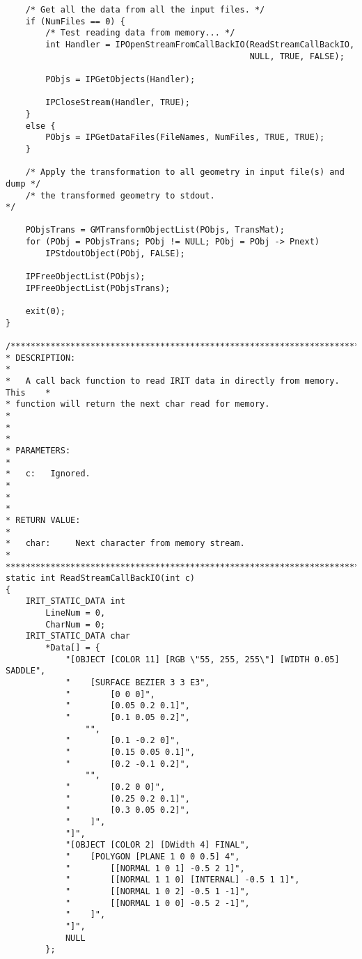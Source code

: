 \begin{verbatim}
    /* Get all the data from all the input files. */
    if (NumFiles == 0) {
        /* Test reading data from memory... */
        int Handler = IPOpenStreamFromCallBackIO(ReadStreamCallBackIO,
                                                 NULL, TRUE, FALSE);

        PObjs = IPGetObjects(Handler);

        IPCloseStream(Handler, TRUE);
    }
    else {
        PObjs = IPGetDataFiles(FileNames, NumFiles, TRUE, TRUE);
    }

    /* Apply the transformation to all geometry in input file(s) and dump */
    /* the transformed geometry to stdout.                                  */

    PObjsTrans = GMTransformObjectList(PObjs, TransMat);
    for (PObj = PObjsTrans; PObj != NULL; PObj = PObj -> Pnext)
        IPStdoutObject(PObj, FALSE);

    IPFreeObjectList(PObjs);
    IPFreeObjectList(PObjsTrans);

    exit(0);
}

/*****************************************************************************
* DESCRIPTION:                                                               *
*   A call back function to read IRIT data in directly from memory.  This    *
* function will return the next char read for memory.                        *
*                                                                            *
* PARAMETERS:                                                                *
*   c:   Ignored.                                                            *
*                                                                            *
* RETURN VALUE:                                                              *
*   char:     Next character from memory stream.                             *
*****************************************************************************/
static int ReadStreamCallBackIO(int c)
{
    IRIT_STATIC_DATA int
        LineNum = 0,
        CharNum = 0;
    IRIT_STATIC_DATA char
        *Data[] = {
            "[OBJECT [COLOR 11] [RGB \"55, 255, 255\"] [WIDTH 0.05] SADDLE",
            "    [SURFACE BEZIER 3 3 E3",
            "        [0 0 0]",
            "        [0.05 0.2 0.1]",
            "        [0.1 0.05 0.2]",
                "",
            "        [0.1 -0.2 0]",
            "        [0.15 0.05 0.1]",
            "        [0.2 -0.1 0.2]",
                "",
            "        [0.2 0 0]",
            "        [0.25 0.2 0.1]",
            "        [0.3 0.05 0.2]",
            "    ]",
            "]",
            "[OBJECT [COLOR 2] [DWidth 4] FINAL",
            "    [POLYGON [PLANE 1 0 0 0.5] 4",
            "        [[NORMAL 1 0 1] -0.5 2 1]",
            "        [[NORMAL 1 1 0] [INTERNAL] -0.5 1 1]",
            "        [[NORMAL 1 0 2] -0.5 1 -1]",
            "        [[NORMAL 1 0 0] -0.5 2 -1]",
            "    ]",
            "]",
            NULL
        };


\end{verbatim}
